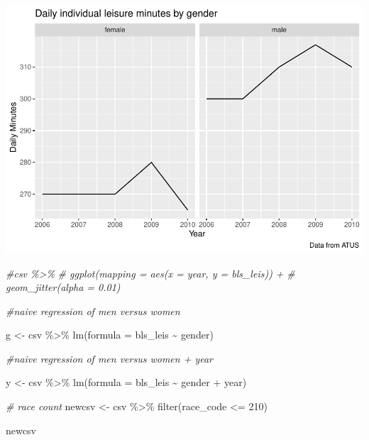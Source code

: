 \documentclass[
]{article}
\newenvironment{Shaded}{\begin{snugshade}}{\end{snugshade}}
\newcommand{\AttributeTok}[1]{\textcolor[rgb]{0.77,0.63,0.00}{#1}}
\newcommand{\CommentTok}[1]{\textcolor[rgb]{0.56,0.35,0.01}{\textit{#1}}}
\newcommand{\DecValTok}[1]{\textcolor[rgb]{0.00,0.00,0.81}{#1}}
\newcommand{\FunctionTok}[1]{\textcolor[rgb]{0.00,0.00,0.00}{#1}}
\newcommand{\NormalTok}[1]{#1}
\newcommand{\OtherTok}[1]{\textcolor[rgb]{0.56,0.35,0.01}{#1}}
\newcommand{\SpecialCharTok}[1]{\textcolor[rgb]{0.00,0.00,0.00}{#1}}
\begin{document}
\includegraphics{Paper2_files/figure-latex/graphs-12.pdf}

\begin{Shaded}
\begin{Highlighting}[]
\CommentTok{\#csv \%\textgreater{}\%}
 \CommentTok{\# ggplot(mapping = aes(x = year, y = bls\_leis)) + }
 \CommentTok{\# geom\_jitter(alpha = 0.01)}
\end{Highlighting}
\end{Shaded}

\begin{Shaded}
\begin{Highlighting}[]
\CommentTok{\#naive regression of men versus women}
  

\NormalTok{g }\OtherTok{\textless{}{-}}\NormalTok{ csv }\SpecialCharTok{\%\textgreater{}\%}
  \FunctionTok{lm}\NormalTok{(}\AttributeTok{formula =}\NormalTok{ bls\_leis }\SpecialCharTok{\textasciitilde{}}\NormalTok{ gender)}

\CommentTok{\#naive regression of men versus women + year }

\NormalTok{y }\OtherTok{\textless{}{-}}\NormalTok{ csv }\SpecialCharTok{\%\textgreater{}\%}
  \FunctionTok{lm}\NormalTok{(}\AttributeTok{formula =}\NormalTok{ bls\_leis }\SpecialCharTok{\textasciitilde{}}\NormalTok{ gender }\SpecialCharTok{+}\NormalTok{ year)}

\CommentTok{\# race count}
\NormalTok{newcsv }\OtherTok{\textless{}{-}}\NormalTok{ csv }\SpecialCharTok{\%\textgreater{}\%}
 \FunctionTok{filter}\NormalTok{(race\_code }\SpecialCharTok{\textless{}=} \DecValTok{210}\NormalTok{)}

\NormalTok{newcsv}
\end{Highlighting}
\end{Shaded}
\end{document}
